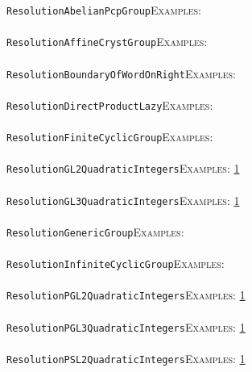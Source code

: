 \documentclass[a4paper,11pt]{report}
\begin{document}
{{ \texttt{ResolutionAbelianPcpGroup}{\nobreakspace}{\nobreakspace}{\nobreakspace}{\nobreakspace}\textsc{Examples:} \\
 \\
 \texttt{ResolutionAffineCrystGroup}{\nobreakspace}{\nobreakspace}{\nobreakspace}{\nobreakspace}\textsc{Examples:} \\
 \\
 \texttt{ResolutionBoundaryOfWordOnRight}{\nobreakspace}{\nobreakspace}{\nobreakspace}{\nobreakspace}\textsc{Examples:} \\
 \\
 \texttt{ResolutionDirectProductLazy}{\nobreakspace}{\nobreakspace}{\nobreakspace}{\nobreakspace}\textsc{Examples:} \\
 \\
 \texttt{ResolutionFiniteCyclicGroup}{\nobreakspace}{\nobreakspace}{\nobreakspace}{\nobreakspace}\textsc{Examples:} \\
 \\
 \texttt{ResolutionGL2QuadraticIntegers}{\nobreakspace}{\nobreakspace}{\nobreakspace}{\nobreakspace}\textsc{Examples:} \href{tutorial/chap10.html} {1}{\nobreakspace} \\
 \\
 \texttt{ResolutionGL3QuadraticIntegers}{\nobreakspace}{\nobreakspace}{\nobreakspace}{\nobreakspace}\textsc{Examples:} \href{tutorial/chap10.html} {1}{\nobreakspace} \\
 \\
 \texttt{ResolutionGenericGroup}{\nobreakspace}{\nobreakspace}{\nobreakspace}{\nobreakspace}\textsc{Examples:} \\
 \\
 \texttt{ResolutionInfiniteCyclicGroup}{\nobreakspace}{\nobreakspace}{\nobreakspace}{\nobreakspace}\textsc{Examples:} \\
 \\
 \texttt{ResolutionPGL2QuadraticIntegers}{\nobreakspace}{\nobreakspace}{\nobreakspace}{\nobreakspace}\textsc{Examples:} \href{tutorial/chap10.html} {1}{\nobreakspace} \\
 \\
 \texttt{ResolutionPGL3QuadraticIntegers}{\nobreakspace}{\nobreakspace}{\nobreakspace}{\nobreakspace}\textsc{Examples:} \href{tutorial/chap10.html} {1}{\nobreakspace} \\
 \\
 \texttt{ResolutionPSL2QuadraticIntegers}{\nobreakspace}{\nobreakspace}{\nobreakspace}{\nobreakspace}\textsc{Examples:} \href{tutorial/chap10.html} {1}{\nobreakspace} \\
}}
\end{document}
